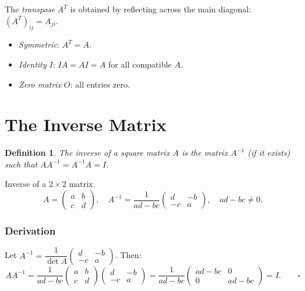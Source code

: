 \documentclass[12pt,a4paper]{article}
\theoremstyle{defstyle}
\newtheorem{definition}{Definition}[section]
\begin{document}
\begin{result}{}{}
The \emph{transpose} \(A^T\) is obtained by reflecting across the main diagonal: \((A^T)_{ij}=A_{ji}\).
\begin{itemize}[nosep]
  \item \emph{Symmetric}: \(A^T=A\).
  \item \emph{Identity} \(I\): \(IA=AI=A\) for all compatible \(A\).
  \item \emph{Zero matrix} \(O\): all entries zero.
\end{itemize}
\end{result}

\section{The Inverse Matrix}

\begin{definition}
The \emph{inverse} of a square matrix \(A\) is the matrix \(A^{-1}\) (if it exists) such that
\(AA^{-1}=A^{-1}A=I\).
\end{definition}

\begin{result}{Inverse of a $2\times2$ matrix}{}
\[
  A = \begin{pmatrix}a&b\\c&d\end{pmatrix},\quad
  A^{-1} = \frac{1}{ad-bc}\begin{pmatrix}d&-b\\-c&a\end{pmatrix},\quad ad-bc\neq 0.
\]
\end{result}

\subsubsection*{Derivation}
Let \(A^{-1}=\dfrac{1}{\det A}\begin{pmatrix}d&-b\\-c&a\end{pmatrix}\). Then:
\[
  AA^{-1}=\frac{1}{ad-bc}\begin{pmatrix}a&b\\c&d\end{pmatrix}\begin{pmatrix}d&-b\\-c&a\end{pmatrix}
  =\frac{1}{ad-bc}\begin{pmatrix}ad-bc&0\\0&ad-bc\end{pmatrix}=I. \qquad\square
\]
\end{document}
